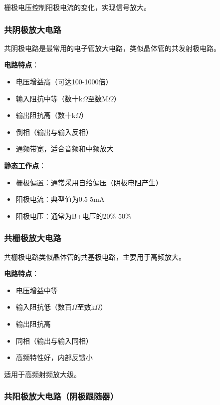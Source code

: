 栅极电压控制阳极电流的变化，实现信号放大。

\subsubsection{共阴极放大电路}
\label{sec:tube_common_cathode}

共阴极电路是最常用的电子管放大电路，类似晶体管的共发射极电路。

\textbf{电路特点}：
\begin{itemize}
    \item 电压增益高（可达100-1000倍）
    \item 输入阻抗中等（数十k$\Omega$至数M$\Omega$）
    \item 输出阻抗高（数十k$\Omega$）
    \item 倒相（输出与输入反相）
    \item 通频带宽，适合音频和中频放大
\end{itemize}

\textbf{静态工作点}：
\begin{itemize}
    \item 栅极偏置：通常采用自给偏压（阴极电阻产生）
    \item 阳极电流：典型值为0.5-5mA
    \item 阳极电压：通常为B+电压的20\%-50\%
\end{itemize}

\subsubsection{共栅极放大电路}
\label{sec:tube_common_grid}

共栅极电路类似晶体管的共基极电路，主要用于高频放大。

\textbf{电路特点}：
\begin{itemize}
    \item 电压增益中等
    \item 输入阻抗低（数百$\Omega$至数k$\Omega$）
    \item 输出阻抗高
    \item 同相（输出与输入同相）
    \item 高频特性好，内部反馈小
\end{itemize}

适用于高频射频放大级。

\subsubsection{共阳极放大电路（阴极跟随器）}
\label{sec:tube_cathode_follower}

